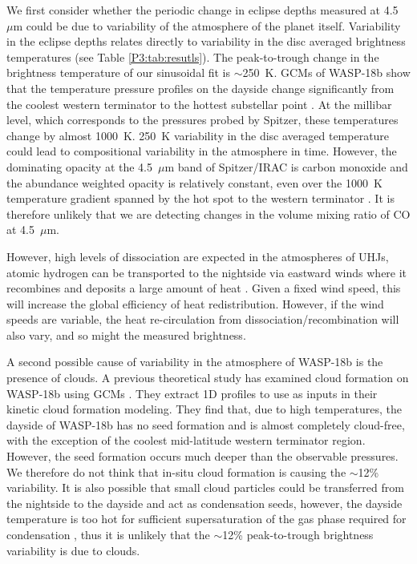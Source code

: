 We first consider whether the periodic change in eclipse depths measured at 4.5~$\mu$m could be due to variability of the atmosphere of the planet itself. Variability in the eclipse depths relates directly to variability in the disc averaged brightness temperatures (see Table \ref{P3:tab:resutls}). The peak-to-trough change in the brightness temperature of our sinusoidal fit is $\sim$250~K. GCMs of WASP-18b show that the temperature pressure profiles on the dayside change significantly from the coolest western terminator to the hottest substellar point \citet{Helling2019a}. At the millibar level, which corresponds to the pressures probed by Spitzer, these temperatures change by almost 1000~K. 250~K variability in the disc averaged temperature could lead to compositional variability in the atmosphere in time. However, the dominating opacity at the 4.5~$\mu$m band of Spitzer/IRAC is carbon monoxide and the abundance weighted opacity is relatively constant, even over the 1000~K temperature gradient spanned by the hot spot to the western terminator \citep[e.g.,][]{Moses2013a}. It is therefore unlikely that we are detecting changes in the volume mixing ratio of CO at 4.5~$\mu$m.


However, high levels of  dissociation are expected in the atmospheres of UHJs, atomic hydrogen can be transported to the nightside via eastward winds where it recombines and deposits a large amount of heat \citep{Komacek2018a, Bell2018}. Given a fixed wind speed, this will increase the global efficiency of heat redistribution. However, if the wind speeds are variable, the heat re-circulation from  dissociation/recombination will also vary, and so might the measured brightness.

A second possible cause of variability in the atmosphere of WASP-18b is the presence of clouds. A previous theoretical study has examined cloud formation on WASP-18b using GCMs \citep{Helling2019a}. They extract 1D profiles to use as inputs in their kinetic cloud formation modeling. They find that, due to high temperatures, the dayside of WASP-18b has no seed formation and is almost completely cloud-free, with the exception of the coolest mid-latitude western terminator region. However, the seed formation occurs much deeper than the observable pressures. We therefore do not think that in-situ cloud formation is causing the $\sim$12\% variability. It is also possible that small cloud particles could be transferred from the nightside to the dayside and act as condensation seeds, however, the dayside temperature is too hot for sufficient supersaturation of the gas phase required for condensation \citep{Helling2019a}, thus it is unlikely that the $\sim$12\% peak-to-trough brightness variability is due to clouds.

